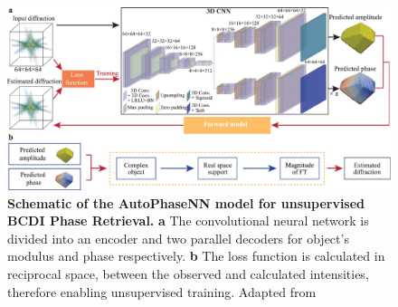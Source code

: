 \begin{figure}[H]
    \centering
    \includegraphics[width=.8\textwidth]{figures/Phasing/autophasenn.pdf}
    \caption{\textbf{Schematic of the AutoPhaseNN model for unsupervised BCDI Phase Retrieval.} \textbf{a} The convolutional 
    neural network is divided into an encoder and two parallel decoders for object's modulus and phase respectively. \textbf{b} 
    The loss function is calculated in reciprocal space, between the observed and calculated intensities, therefore enabling 
    unsupervised training. Adapted from \cite{yao_autophasenn_2022} }
    \label{fig:autophasenn}
\end{figure}

